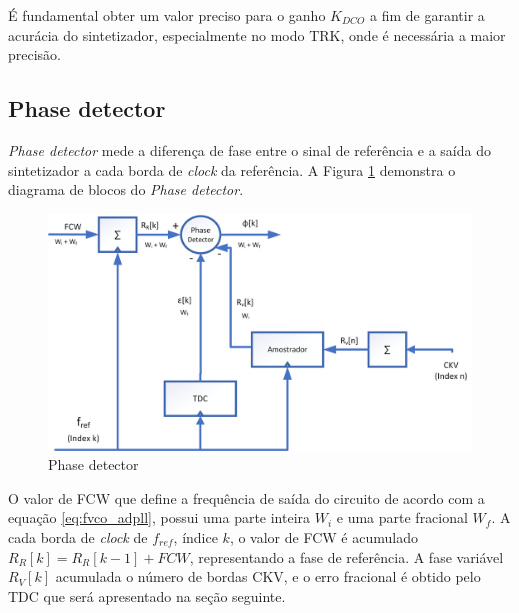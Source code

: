 É fundamental obter um valor preciso para o ganho $K_{DCO}$ a fim de garantir a acurácia do sintetizador, especialmente no modo TRK, onde é necessária a maior precisão.



\subsection{Phase detector}
\textit{Phase detector } mede a diferença de fase entre o sinal de referência e a saída do sintetizador a cada borda de \textit{clock} da referência. A Figura \ref{fig:phase_detector_block} demonstra o diagrama de blocos do \textit{Phase detector}.

\begin{figure}[h!]
	\caption{Phase detector}
	\begin{center}
		\includegraphics[scale=0.8]{img/phase_detector_block.png}
	\end{center}
	\label{fig:phase_detector_block}
\end{figure}

O valor de FCW que define a frequência de saída do circuito de acordo com a equação \ref{eq:fvco_adpll}, possui uma parte inteira $W_i$ e uma parte fracional $W_f$. 
 A cada borda de \textit{clock} de $f_{ref}$, índice $k$, o valor de FCW é acumulado $R_R[k] = R_R[k-1] + FCW$, representando a fase de referência. A fase variável $R_V[k]$ acumulada o número de bordas CKV, e o erro fracional é obtido pelo TDC que será apresentado na seção seguinte.

